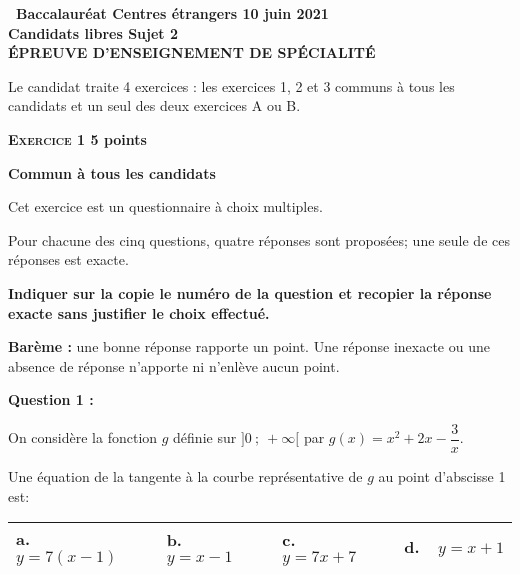 \documentclass[11pt,a4paper]{article}
\begin{document}
\setlength\parindent{0mm}
\pagestyle{fancy}
\thispagestyle{empty}

\begin{center}{\Large\textbf{\decofourleft~Baccalauréat Centres étrangers 10 juin 2021~\decofourright\\[6pt] Candidats libres  Sujet 2\\[6pt] ÉPREUVE D'ENSEIGNEMENT DE SPÉCIALITÉ}}
\end{center}

\vspace{0,25cm}

Le candidat traite 4 exercices : les exercices 1, 2 et 3 communs à tous les candidats et un seul des deux exercices A ou B.

\bigskip

\textbf{\textsc{Exercice 1} \hfill 5 points}

\textbf{Commun à tous les candidats}

\medskip

Cet exercice est un questionnaire à choix multiples.

Pour chacune des cinq questions, quatre
réponses sont proposées; une seule de ces réponses est exacte.

\smallskip

\textbf{Indiquer sur la copie le numéro de la question et recopier la réponse exacte sans justifier le choix effectué.}

\textbf{Barème :} une bonne réponse rapporte un point. Une réponse inexacte ou une absence de réponse n'apporte ni n'enlève aucun point.

\bigskip

\textbf{Question 1 :}

On considère la fonction $g$ définie sur $]0~;~+\infty[$  par $g(x)= x^2+ 2x - \dfrac{3}{x}$.

Une équation de la tangente à la courbe représentative de $g$ au point d'abscisse 1 est:
\begin{center}
\begin{tabularx}{\linewidth}{|*{4}{X|}}\hline
\textbf{a.~~} $y=7(x - 1)$&\textbf{b.~~} $y = x - 1$&\textbf{c.~~} $y = 7x + 7$&\textbf{d.~~}$ y = x +1$\\ \hline
\end{tabularx}
\end{center}

\medskip
\end{document}
